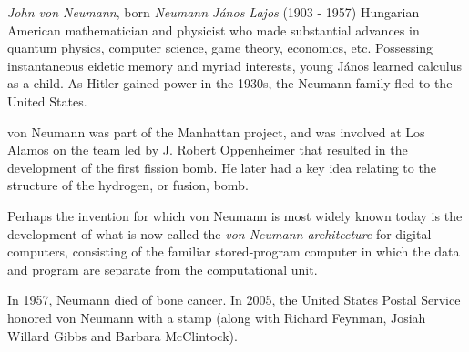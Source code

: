 \documentclass[12pt]{article}
\begin{document}

\emph{John von Neumann}, born \emph{Neumann J\'anos Lajos} (1903 - 1957) Hungarian American mathematician and physicist who made substantial advances in quantum physics, computer science, game theory, economics, etc. Possessing instantaneous eidetic memory and myriad interests, young J\'anos learned calculus as a child. As Hitler gained power in the 1930s, the Neumann family fled to the United States.

von Neumann was part of the Manhattan project, and was involved at Los Alamos on the team led by J. Robert Oppenheimer that resulted in the development of the first fission bomb. He later had a key idea relating to the structure of the hydrogen, or fusion, bomb.

Perhaps the invention for which von Neumann is most widely known today is the development of what is now called the \emph{von Neumann architecture} for digital computers, consisting of the familiar stored-program computer in which the data and program are separate from the computational unit.

In 1957, Neumann died of bone cancer. In 2005, the United States Postal Service honored von Neumann with a stamp (along with Richard Feynman, Josiah Willard Gibbs and Barbara McClintock).
\end{document}
